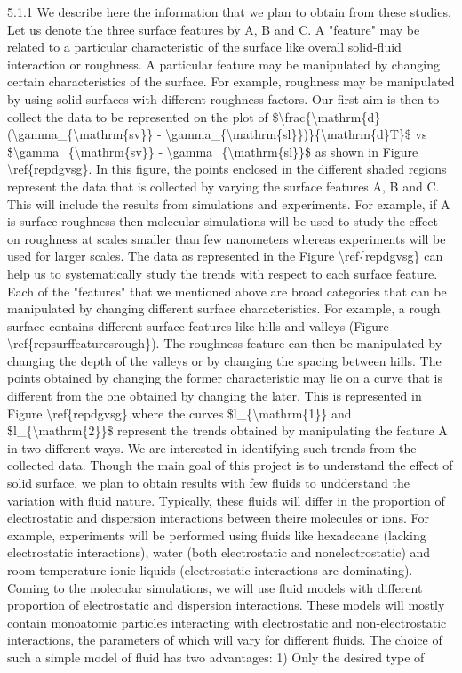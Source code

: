 \par 5.1.1 We describe here the information that we plan to obtain from these studies. Let us denote the three surface features by A, B and C. A "feature" may be related to a particular characteristic of the surface like overall solid-fluid interaction or roughness. A particular feature may be manipulated by changing certain characteristics of the surface. For example, roughness may be manipulated by using solid surfaces with different roughness factors. Our first aim is then to collect the data to be represented on the plot of \$\textbackslash frac\{\textbackslash mathrm\{d\}(\textbackslash gamma\_\{\textbackslash mathrm\{sv\}\} - \textbackslash gamma\_\{\textbackslash mathrm\{sl\}\})\}\{\textbackslash mathrm\{d\}T\}\$ vs \$\textbackslash gamma\_\{\textbackslash mathrm\{sv\}\} - \textbackslash gamma\_\{\textbackslash mathrm\{sl\}\}\$ as shown in Figure \textbackslash ref\{repdgvsg\}. In this figure, the points enclosed in the different shaded regions represent the data that is collected by varying the surface features A, B and C. This will include the results from simulations and experiments. For example, if A is surface roughness then molecular simulations will be used to study the effect on roughness at scales smaller than few nanometers whereas experiments will be used for larger scales. The data as represented in the Figure \textbackslash ref\{repdgvsg\} can help us to systematically study the trends with respect to each surface feature. Each of the "features" that we mentioned above are broad categories that can be manipulated by changing different surface characteristics. For example, a rough surface contains  different surface features like hills and valleys (Figure \textbackslash ref\{repsurffeaturesrough\}). The roughness feature can then be manipulated by changing the depth of the valleys or by changing the spacing between hills. The points obtained by changing the former characteristic may lie on a curve that is different from the one obtained by changing the later. This is represented in Figure \textbackslash ref\{repdgvsg\} where the curves \$l\_\{\textbackslash mathrm\{1\}\} and \$l\_\{\textbackslash mathrm\{2\}\}\$ represent the trends obtained by manipulating the feature A in two different ways. We are interested in identifying such trends from the collected data. Though the main goal of this project is to understand the effect of solid surface, we plan to obtain results with few fluids to undderstand the variation with fluid nature. Typically, these fluids will differ in the proportion of electrostatic and dispersion interactions between theire molecules or ions. For example, experiments will be performed using fluids like hexadecane (lacking electrostatic interactions), water (both electrostatic and nonelectrostatic) and room temperature ionic liquids (electrostatic interactions are dominating). Coming to the molecular simulations, we will use fluid models with different proportion of electrostatic and dispersion interactions. These models will mostly contain monoatomic particles interacting with electrostatic and non-electrostatic interactions, the parameters of which will vary for different fluids. The choice of such a simple model of fluid has two advantages: 1) Only the desired type of 
